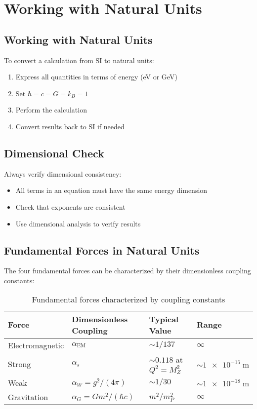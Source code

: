 \documentclass[11pt,a4paper]{article}
\begin{document}
	\section{Working with Natural Units}
	
	\subsection{Working with Natural Units}
	
	To convert a calculation from SI to natural units:
	\begin{enumerate}
		\item Express all quantities in terms of energy (eV or GeV)
		\item Set $\hbar = c = G = k_B = 1$
		\item Perform the calculation
		\item Convert results back to SI if needed
	\end{enumerate}
	
	\subsection{Dimensional Check}
	
	Always verify dimensional consistency:
	\begin{itemize}
		\item All terms in an equation must have the same energy dimension
		\item Check that exponents are consistent
		\item Use dimensional analysis to verify results
	\end{itemize}
	
	\subsection{Fundamental Forces in Natural Units}
	
	The four fundamental forces can be characterized by their dimensionless coupling constants:
	
	\begin{table}[htbp]
		\centering
		\begin{adjustbox}{width=0.9\textwidth}
			\begin{tabular}{llll}
				\toprule
				\textbf{Force} & \textbf{Dimensionless Coupling} & \textbf{Typical Value} & \textbf{Range} \\
				\midrule
				Electromagnetic & $\alpha_{\text{EM}}$ & $\sim 1/137$ & $\infty$ \\
				Strong & $\alpha_s$ & $\sim 0.118$ at $Q^2 = M_Z^2$ & $\sim \SI{1e-15}{\meter}$ \\
				Weak & $\alpha_W = g^2/(4\pi)$ & $\sim 1/30$ & $\sim \SI{1e-18}{\meter}$ \\
				Gravitation & $\alpha_G = G m^2/(\hbar c)$ & $m^2/m_P^2$ & $\infty$ \\
				\bottomrule
			\end{tabular}
		\end{adjustbox}
		\caption{Fundamental forces characterized by coupling constants}
		\label{tab:forces}
	\end{table}
	
\end{document}
